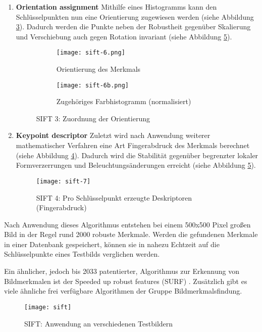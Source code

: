 \begin{enumerate}
    \item \textbf{Orientation assignment}\newline
    Mithilfe eines Histogramms kann den Schlüsselpunkten nun eine Orientierung
    zugewiesen werden (siehe Abbildung \ref{fig:sift-orientation}). Dadurch
    werden die Punkte neben der Robustheit gegenüber Skalierung und Verschiebung
    auch gegen Rotation invariant (siehe Abbildung \ref{fig:sift}).
    \parencite{sift-web-orientation}

    \begin{figure}[H]
        \centering
        \begin{subfigure}{.5\textwidth}
          \centering
          \texttt{[image: sift-6.png]}
          \caption{Orientierung des Merkmals}
          \label{fig:sift6}
        \end{subfigure}%
        \begin{subfigure}{.5\textwidth}
          \centering
          \texttt{[image: sift-6b.png]}
          \caption{Zugehöriges Farbhistogramm (normalisiert)}
          \label{fig:sift6b}
        \end{subfigure}
        \caption{SIFT 3: Zuordnung der Orientierung}
        \label{fig:sift-orientation}
    \end{figure}

    \item \textbf{Keypoint descriptor}\newline
    Zuletzt wird nach Anwendung weiterer mathematischer Verfahren eine Art
    Fingerabdruck des Merkmals berechnet (siehe Abbildung \ref{fig:sift7}).
    Dadurch wird die Stabilität gegenüber begrenzter lokaler Formverzerrungen
    und Beleuchtungsänderungen erreicht (siehe Abbildung \ref{fig:sift}).
    \parencite{sift-web-descriptor}

    \begin{figure}[H]
        \centering
        \texttt{[image: sift-7]}
        \caption{SIFT 4: Pro Schlüsselpunkt erzeugte Deskriptoren (Fingerabdruck)}
        \label{fig:sift7}
    \end{figure}
\end{enumerate}

Nach Anwendung dieses Algorithmus entstehen bei einem 500x500 Pixel großen Bild
in der Regel rund 2000 robuste Merkmale. Werden die gefundenen Merkmale in einer 
Datenbank gespeichert, können sie in nahezu Echtzeit auf die Schlüsselpunkte
eines Testbilds verglichen werden. \parencite{sift-distinctive-features}

Ein ähnlicher, jedoch bis 2033 patentierter, Algorithmus zur Erkennung von
Bildmerkmalen ist der \glqq{}Speeded up robust features (SURF)\grqq{}
\parencite{sift-surf}. Zusätzlich gibt es viele ähnliche frei verfügbare 
Algorithmen der Gruppe \glqq{}Bildmerkmalsfindung\grqq{}.

\begin{figure}[H]
    \centering
    \texttt{[image: sift]}
    \caption{SIFT: Anwendung an verschiedenen Testbildern}
    \label{fig:sift}
\end{figure}
